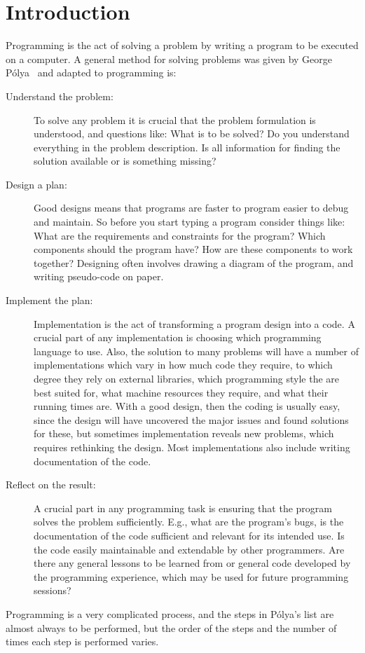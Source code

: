 \chapter{Introduction}

Programming is the act of solving a problem by writing a program to be executed on a computer. A general method for solving problems was given by George Pólya~\cite{polya45} and adapted to programming is:
\begin{description}
\item[Understand the problem:] To solve any problem it is crucial that the problem formulation is understood, and questions like: What is to be solved? Do you understand everything in the problem description. Is all information for finding the solution available or is something missing?
\item[Design a plan:] Good designs means that programs are faster to program easier to debug and maintain. So before you start typing a program consider things like: What are the requirements and constraints for the program? Which components should the program have? How are these components to work together? Designing often involves drawing a diagram of the program, and writing pseudo-code on paper.
\item[Implement the plan:] Implementation is the act of transforming a program design into a code. A crucial part of any implementation is choosing which programming language to use. Also, the solution to many problems will have a number of implementations which vary in how much code they require, to which degree they rely on external libraries, which programming style the are best suited for, what machine resources they require, and what their running times are.  With a good design, then the coding is usually easy, since the design will have uncovered the major issues and found solutions for these, but sometimes implementation reveals new problems, which requires rethinking the design. Most implementations also include writing documentation of the code.
\item[Reflect on the result:] A crucial part in any programming task is ensuring that the program solves the problem sufficiently. E.g., what are the program's bugs, is the documentation of the code sufficient and relevant for its intended use. Is the code easily maintainable and extendable by other programmers. Are there any general lessons to be learned from or general code developed by the programming experience, which may be used for future programming sessions?
\end{description}
Programming is a very complicated process, and the steps in Pólya's list are almost always to be performed, but the order of the steps and the number of times each step is performed varies.

